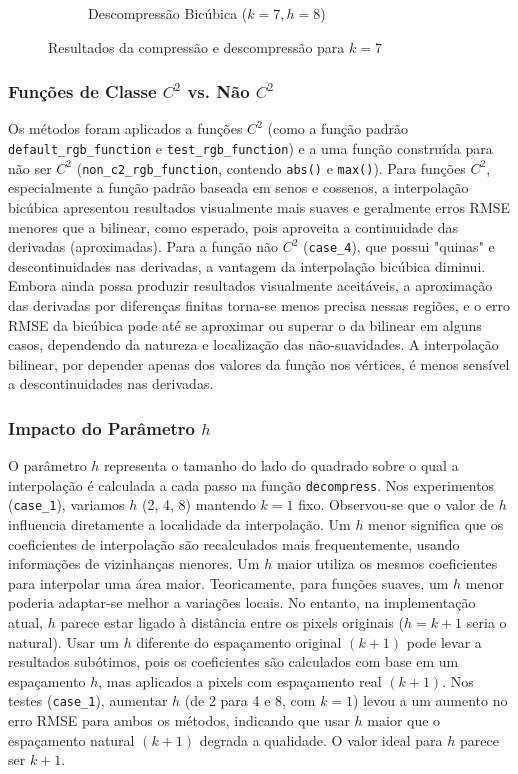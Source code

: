 \documentclass[12pt, a4paper]{article}
\begin{document}
\begin{figure}[H]
\begin{subfigure}[b]{0.45\textwidth}
        \caption{Descompressão Bicúbica ($k=7, h=8$)}
        \label{fig:zoo_bicubic_k7h8}
    \end{subfigure}
    \caption{Resultados da compressão e descompressão para $k=7$}
    \label{fig:zoo_results_k7}
\end{figure}

\subsubsection{Funções de Classe $C^2$ vs. Não $C^2$}
Os métodos foram aplicados a funções $C^2$ (como a função padrão \texttt{default\_rgb\_function} e \texttt{test\_rgb\_function}) e a uma função construída para não ser $C^2$ (\texttt{non\_c2\_rgb\_function}, contendo \texttt{abs()} e \texttt{max()}).
Para funções $C^2$, especialmente a função padrão baseada em senos e cossenos, a interpolação bicúbica apresentou resultados visualmente mais suaves e geralmente erros RMSE menores que a bilinear, como esperado, pois aproveita a continuidade das derivadas (aproximadas).
Para a função não $C^2$ (\texttt{case\_4}), que possui "quinas" e descontinuidades nas derivadas, a vantagem da interpolação bicúbica diminui. Embora ainda possa produzir resultados visualmente aceitáveis, a aproximação das derivadas por diferenças finitas torna-se menos precisa nessas regiões, e o erro RMSE da bicúbica pode até se aproximar ou superar o da bilinear em alguns casos, dependendo da natureza e localização das não-suavidades. A interpolação bilinear, por depender apenas dos valores da função nos vértices, é menos sensível a descontinuidades nas derivadas.

\subsubsection{Impacto do Parâmetro $h$}
O parâmetro $h$ representa o tamanho do lado do quadrado sobre o qual a interpolação é calculada a cada passo na função \texttt{decompress}. Nos experimentos (\texttt{case\_1}), variamos $h$ (2, 4, 8) mantendo $k=1$ fixo.
Observou-se que o valor de $h$ influencia diretamente a localidade da interpolação. Um $h$ menor significa que os coeficientes de interpolação são recalculados mais frequentemente, usando informações de vizinhanças menores. Um $h$ maior utiliza os mesmos coeficientes para interpolar uma área maior.
Teoricamente, para funções suaves, um $h$ menor poderia adaptar-se melhor a variações locais. No entanto, na implementação atual, $h$ parece estar ligado à distância entre os pixels originais ($h = k+1$ seria o natural). Usar um $h$ diferente do espaçamento original $(k+1)$ pode levar a resultados subótimos, pois os coeficientes são calculados com base em um espaçamento $h$, mas aplicados a pixels com espaçamento real $(k+1)$. Nos testes (\texttt{case\_1}), aumentar $h$ (de 2 para 4 e 8, com $k=1$) levou a um aumento no erro RMSE para ambos os métodos, indicando que usar $h$ maior que o espaçamento natural $(k+1)$ degrada a qualidade. O valor ideal para $h$ parece ser $k+1$.
\end{document}
